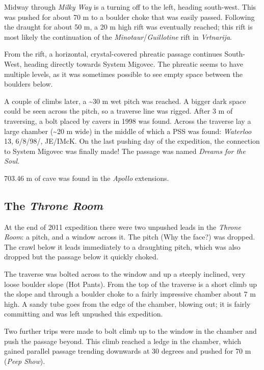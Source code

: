 Midway through \emph{Milky Way} is a turning off to the left, heading
south-west. This was pushed for about 70 m to a boulder choke that was
easily passed. Following the draught for about 50 m, a 20 m high rift
was eventually reached; this rift is most likely the continuation of the
\emph{Minotaur}/\emph{Guillotine} rift in \emph{Vrtnarija}.

From the rift, a horizontal, crystal-covered phreatic passage continues
South-West, heading directly towards System Migovec. The phreatic seems
to have multiple levels, as it was sometimes possible to see empty space
between the boulders below.

A couple of climbs later, a \textasciitilde 30 m wet pitch was reached.
A bigger dark space could be seen across the pitch, so a traverse line
was rigged. After 3 m of traversing, a bolt placed by cavers in 1998 was
found. Across the traverse lay a large chamber (\textasciitilde 20 m
wide) in the middle of which a PSS was found: \emph{Waterloo} 13,
6/8/98/, JE/IMcK. On the last pushing day of the expedition, the
connection to System Migovec was finally made! The passage was named
\emph{Dreams for the Soul}.

703.46 m of cave was found in the \emph{Apollo} extensions.

\hypertarget{the-throne-room}{%
\subsection{\texorpdfstring{The \emph{Throne
Room}}{The Throne Room}}\label{the-throne-room}}

At the end of 2011 expedition there were two unpushed leads in the
\emph{Throne Room}: a pitch, and a window across it. The pitch (Why the
face?) was dropped. The crawl below it leads immediately to a draughting
pitch, which was also dropped but the passage below it quickly choked.

The traverse was bolted across to the window and up a steeply inclined,
very loose boulder slope (Hot Pants). From the top of the traverse is a
short climb up the slope and through a boulder choke to a fairly
impressive chamber about 7 m high. A sandy tube goes from the edge of
the chamber, blowing out; it is fairly committing and was left unpushed
this expedition.

Two further trips were made to bolt climb up to the window in the
chamber and push the passage beyond. This climb reached a ledge in the
chamber, which gained parallel passage trending downwards at 30 degrees
and pushed for 70 m (\emph{Peep Show}).

